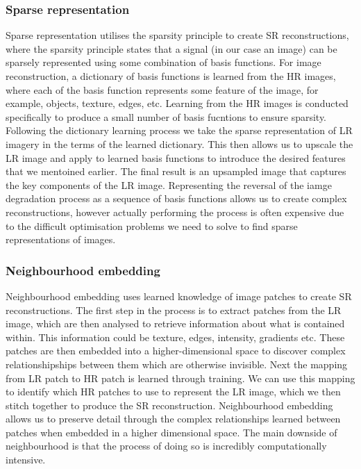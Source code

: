 \subsubsection{Sparse representation}
Sparse representation utilises the sparsity principle to create SR reconstructions, where the sparsity principle states that a signal (in our case an image) can be sparsely represented using some combination of basis functions. For image reconstruction, a dictionary of basis functions is learned from the HR images, where each of the basis function represents some feature of the image, for example, objects, texture, edges, etc. Learning from the HR images is conducted specifically to produce a small number of basis fucntions to ensure sparsity. Following the dictionary learning process we take the sparse representation of LR imagery in the terms of the learned dictionary. This then allows us to upscale the LR image and apply to learned basis functions to introduce the desired features that we mentoined earlier. The final result is an upsampled image that captures the key components of the LR image. Representing the reversal of the iamge degradation process as a sequence of basis functions allows us to create complex reconstructions, however actually performing the process is often expensive due to the difficult optimisation problems we need to solve to find sparse representations of images.

\subsubsection{Neighbourhood embedding}
Neighbourhood embedding uses learned knowledge of image patches to create SR reconstructions. The first step in the process is to extract patches from the LR image, which are then analysed to retrieve information about what is contained within. This information could be texture, edges, intensity, gradients etc. These patches are then embedded into a higher-dimensional space to discover complex relationshipships between them which are otherwise invisible. Next the mapping from LR patch to HR patch is learned through training. We can use this mapping to identify which HR patches to use to represent the LR image, which we then stitch together to produce the SR reconstruction. Neighbourhood embedding allows us to preserve detail through the complex relationships learned between patches when embedded in a higher dimensional space. The main downside of neighbourhood is that the process of doing so is incredibly computationally intensive.

